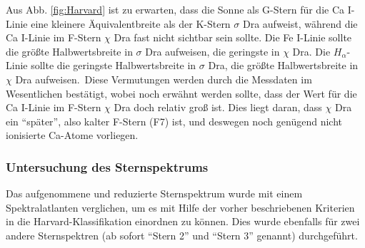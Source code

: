Aus Abb. \ref{fig:Harvard} ist zu erwarten, dass die Sonne als G-Stern für die Ca I-Linie eine kleinere Äquivalentbreite als der K-Stern $\sigma$ Dra aufweist, während die Ca I-Linie im F-Stern $\chi$ Dra fast nicht sichtbar sein sollte. Die Fe I-Linie sollte die größte Halbwertsbreite in $\sigma$ Dra aufweisen, die geringste in $\chi$ Dra. Die $H_\alpha$-Linie sollte die geringste Halbwertsbreite in $\sigma$ Dra, die größte Halbwertsbreite in $\chi$ Dra aufweisen.\
Diese Vermutungen werden durch die Messdaten im Wesentlichen bestätigt, wobei noch erwähnt werden sollte, dass der Wert für die Ca I-Linie im F-Stern $\chi$ Dra doch relativ groß ist. Dies liegt daran, dass $\chi$ Dra ein \enquote{später}, also kalter F-Stern (F7) ist, und deswegen noch genügend nicht ionisierte Ca-Atome vorliegen.
\subsubsection{Untersuchung des Sternspektrums}
Das aufgenommene und reduzierte Sternspektrum wurde mit einem Spektralatlanten verglichen, um es mit Hilfe der vorher beschriebenen Kriterien in die Harvard-Klassifikation einordnen zu können. Dies wurde ebenfalls für zwei andere Sternspektren (ab sofort \enquote{Stern 2} und \enquote{Stern 3} genannt) durchgeführt.
